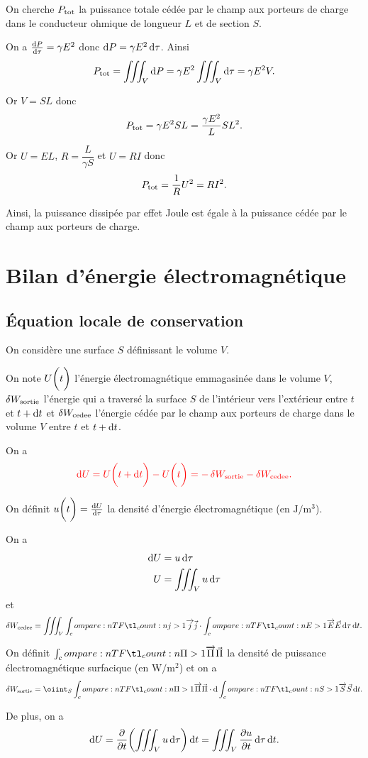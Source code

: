 On cherche \(P_{\mathrm{tot}}\) la puissance totale cédée par le champ aux porteurs de charge dans le conducteur ohmique de longueur \(L\) et de section \(S\).

On a \(\odv{P}{\tau}=\gamma E^2\) donc \(\odif{P}=\gamma E^2\odif{\tau}\). Ainsi \[P_\tot=\iiint_V\odif{P}=\gamma E^2\iiint_V\odif{\tau}=\gamma E^2V.\]

Or \(V=SL\) donc \[P_{\mathrm{tot}}=\gamma E^2SL=\dfrac{\gamma E^2}{L}SL^2.\]

Or \(U=EL\), \(R=\dfrac{L}{\gamma S}\) et \(U=RI\) donc \[P_{\mathrm{tot}}=\dfrac{1}{R}U^2=RI^2.\]

Ainsi, la puissance dissipée par effet Joule est égale à la puissance cédée par le champ aux porteurs de charge.

\section{Bilan d'énergie électromagnétique}

\subsection{Équation locale de conservation}

On considère une surface \(S\) définissant le volume \(V\).

On note \(U\biggl(t\biggr)\) l'énergie électromagnétique emmagasinée dans le volume \(V\), \(\fdif{W_\sortie}\) l'énergie qui a traversé la surface \(S\) de l'intérieur vers l'extérieur entre \(t\) et \(t+\odif{t}\) et \(\fdif{W_\cedee}\) l'énergie cédée par le champ aux porteurs de charge dans le volume \(V\) entre \(t\) et \(t+\odif{t}\).

On a \[\color{red}\odif{U}=U\paren{t+\odif{t}}-U\paren{t}=-\fdif{W_\sortie}-\fdif{W_\cedee}.\]

On définit \(u\paren{t}=\odv{U}{\tau}\) la densité d'énergie électromagnétique (en \(\unit{\joule\per\cubic\metre}\)).

On a \[\begin{aligned}
\odif{U}&=u\odif{\tau} \\
U&=\iiint_Vu\odif{\tau}
\end{aligned}\] et \[\fdif{W_\cedee}=\iiint_V\v{j}\scal\v{E}\odif{\tau}\odif{t}.\]

On définit \(\v{\Pi}\) la densité de puissance électromagnétique surfacique (en \(\unit{\watt\per\square\metre}\)) et on a \[\fdif{W_\sortie}=\oiint_S\v{\Pi}\scal\odif{\v{S}}\odif{t}.\]

De plus, on a \[\odif{U}=\pdv{}{t}\paren{\iiint_Vu\odif{\tau}}\odif{t}=\iiint_V\pdv{u}{t}\odif{\tau}\odif{t}.\]

